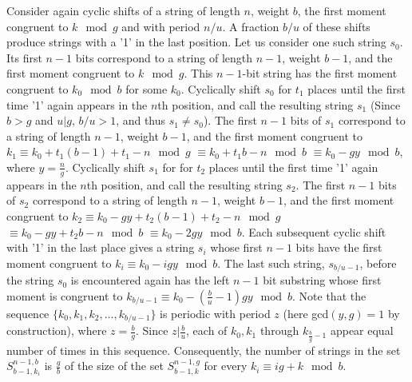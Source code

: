 Consider again cyclic shifts of a string of length $n$, weight $b$,
the first moment congruent to $k \mod g$ and with period $n/u$. A
fraction $b/u$ of these shifts produce strings with a '1' in the
last position. Let us consider one such string $s_0$. Its first
$n-1$ bits correspond to a string of length $n-1$, weight $b-1$, and
the first moment congruent to $k \mod g$. This $n-1$-bit string has
the first moment congruent to $k_0 \mod b$ for some $k_0$.
Cyclically shift $s_0$ for $t_1$ places until the first time '1'
again appears in the $n$th position, and call the resulting string
$s_1$ (Since $b>g$ and $u|g$, $b/u>1$, and thus $s_1 \neq s_0$). The
first $n-1$ bits of $s_1$ correspond to a string of length $n-1$,
weight $b-1$, and the first moment congruent to $k_1 \equiv
k_0+t_1(b-1)+t_1-n \mod g$ $\equiv k_0+t_1b-n \mod b$ $\equiv k_0-gy
\mod b$, where $y=\frac{n}{g}$. Cyclically shift $s_1$ for for $t_2$
places until the first time '1' again appears in the $n$th position,
and call the resulting string $s_2$. The first $n-1$ bits of $s_2$
correspond to a string of length $n-1$, weight $b-1$, and the first
moment congruent to $k_2 \equiv k_0-gy+t_2(b-1)+t_2-n \mod g$
$\equiv k_0-gy+t_2b-n \mod b$ $\equiv k_0-2gy \mod b$. Each
subsequent cyclic shift with  '1' in the last place gives a string
$s_i$ whose first $n-1$ bits have the first moment congruent to $k_i
\equiv k_0-igy \mod b$. The last such string, $s_{b/u-1}$, before
the string $s_0$ is encountered again has the left $n-1$ bit
substring whose first moment is congruent to $k_{b/u-1} \equiv
k_0-(\frac{b}{u}-1)gy \mod b$. Note that the sequence
$\{k_0,k_1,k_2,\dots,k_{b/u-1}\}$ is periodic with period $z$ (here
gcd$(y,g)=1$ by construction), where $z=\frac{b}{g}$. Since
$z|\frac{b}{u}$, each of $k_0,k_1$ through $k_{\frac{b}{g}-1}$
appear equal number of times in this sequence. Consequently, the
number of strings in the set $S_{b-1,k_i}^{n-1,b}$ is $\frac{g}{b}$
of the size of the set $S_{b-1,k}^{n-1,g}$ for every $k_i \equiv
ig+k \mod b$.



